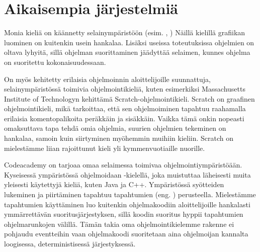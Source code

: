 
\section{Aikaisempia järjestelmiä}
Monia kieliä on käännetty selainympäristöön
(esim. , ) \cite{repl.it}
Näillä kielillä grafiikan luominen on kuitenkin usein hankalaa.
Lisäksi useissa toteutuksissa ohjelmien on oltava lyhyitä,
sillä ohjelman suorittaminen jäädyttää selaimen,
kunnes ohjelma on suoritettu kokonaisuudessaan.

On myös kehitetty erilaisia ohjelmoinnin aloittelijoille suunnattuja,
selainympäristössä toimivia ohjelmointikieliä,
kuten esimerkiksi Massachusetts Institute of Technologyn
kehittämä Scratch-ohjelmointikieli.
Scratch on graafinen ohjelmointikieli,
mikä tarkoittaa,
että sen ohjelmoiminen tapahtuu raahamalla erilaisia komentopalikoita
peräkkäin ja sisäkkäin.
Vaikka tämä onkin nopeasti omaksuttava tapa tehdä omia ohjelmia,
suurien ohjelmien tekeminen on hankalaa,
samoin kuin siirtyminen myöhemmin muihiin kieliin.
Scratch on mielestämme liian rajoittunut kieli
yli kymmenvuotiaille nuorille.

Codeacademy on tarjoaa omaa selaimessa toimivaa ohjelmointiympäristöään.
Kyseisessä ympäristössä ohjelmoidaan -kielellä,
joka muistuttaa läheisesti muita yleisesti käytettyjä kieliä,
kuten Java ja C++.
Ympäristössä syötteiden lukeminen ja piirtäminen
tapahtuu tapahtumien (eng. ) perusteella.
Mielestämme tapahtumien käyttäminen luo kuitenkin ohjelmakoodiin
aloittelijoille hankalasti ymmärrettävän suoritusjärjestyksen,
sillä koodin suoritus hyppii tapahtumien ohjelmarunkojen välillä.
Tämän takia oma ohjelmointikielemme rakenne ei pohjaudu eventteihin
vaan ohjelmakoodi suoritetaan aina ohjelmoijan kannalta loogisessa,
deterministisessä järjestyksessä.

